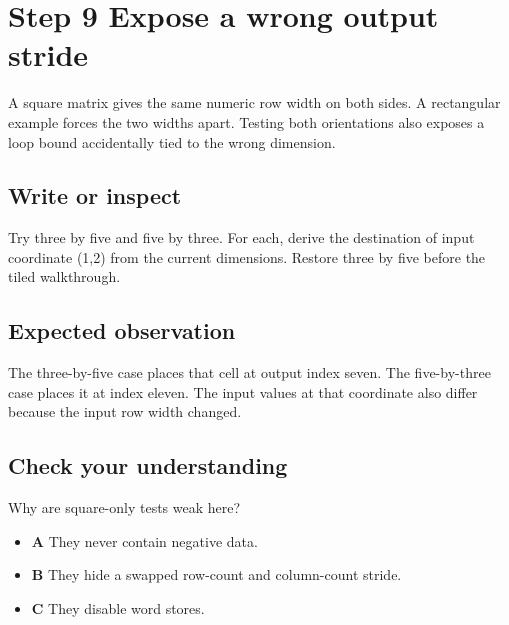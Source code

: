 \section{Step 9 Expose a wrong output stride}\label{transpose-s09}

A square matrix gives the same numeric row width on both sides. A rectangular example forces the two widths apart. Testing both orientations also exposes a loop bound accidentally tied to the wrong dimension.

\subsection{Write or inspect}
Try three by five and five by three. For each, derive the destination of input coordinate (1,2) from the current dimensions. Restore three by five before the tiled walkthrough.

\subsection{Expected observation}
The three-by-five case places that cell at output index seven. The five-by-three case places it at index eleven. The input values at that coordinate also differ because the input row width changed.

\subsection{Check your understanding}
Why are square-only tests weak here?

\begin{itemize}
  \item \textbf{A} They never contain negative data.
  \item \textbf{B} They hide a swapped row-count and column-count stride.
  \item \textbf{C} They disable word stores.
\end{itemize}
